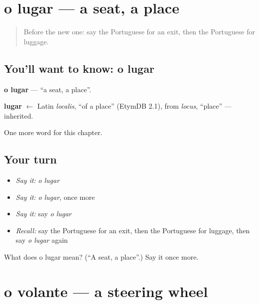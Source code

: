 \section[o lugar]{o lugar — a seat, a place}

\label{lesson:PT-C223-lugar}



\begin{quote}
Before the new one: say the Portuguese for an exit, then the Portuguese for luggage.
\end{quote}

\subsection*{You'll want to know: o lugar}
\textbf{o lugar} — \textquotedblleft{}a seat, a place\textquotedblright{}.

\begin{cousinweb}
\textbf{lugar} $\leftarrow$ Latin \emph{localis}, \textquotedblleft{}of a place\textquotedblright{} (EtymDB 2.1), from \emph{locus}, \textquotedblleft{}place\textquotedblright{} — inherited.
\end{cousinweb}

\begin{grammarlens}[title={What you've built}]
One more word for this chapter.
\end{grammarlens}

\subsection*{Your turn}
\begin{itemize}
\raggedright
  \item \emph{Say it:} \emph{o lugar}
  \item \emph{Say it:} \emph{o lugar}, once more
  \item \emph{Say it:} say \emph{o lugar}
  \item \emph{Recall:} say the Portuguese for an exit, then the Portuguese for luggage, then say \emph{o lugar} again
\end{itemize}

\begin{tcolorbox}[breakable,colback=teal!4,colframe=teal!35!black,title={Before you move on}]
What does o lugar mean? (\textquotedblleft{}A seat, a place\textquotedblright{}.) Say it once more.
\end{tcolorbox}
\section[o volante]{o volante — a steering wheel}

